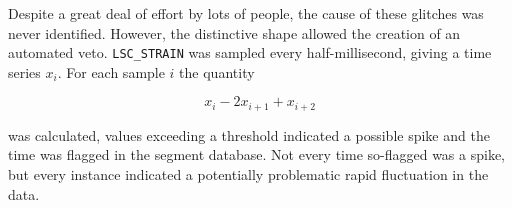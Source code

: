 Despite a great deal of effort by lots of people, the cause of these
glitches was never identified.  However, the distinctive shape allowed
the creation of an automated veto.  \texttt{LSC\_STRAIN} was sampled
every half-millisecond, giving a time series $x_i$.  For each sample
$i$ the quantity 

\begin{equation*}
x_i - 2 x_{i+1} + x_{i+2} 
\end{equation*}

was calculated, values exceeding a threshold indicated a possible
spike and the time was flagged in the segment database.  Not every
time so-flagged was a spike, but every instance indicated a
potentially problematic rapid fluctuation in the data.







